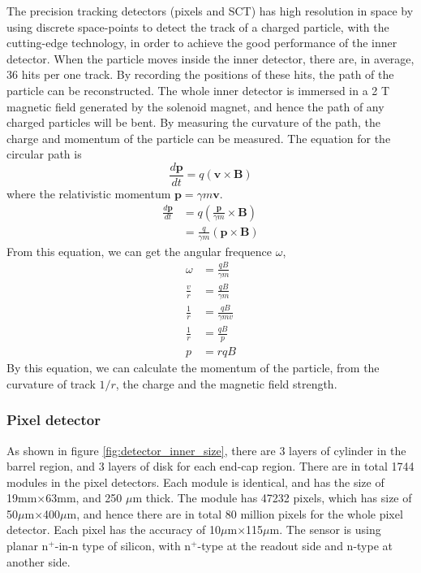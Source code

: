 The precision tracking detectors (pixels and SCT) has high resolution in space by using discrete space-points to detect the track of a charged particle, with the cutting-edge technology, in order to achieve the good performance of the inner detector.
When the particle moves inside the inner detector, there are, in average, 36 hits per one track.
By recording the positions of these hits, the path of the particle can be reconstructed.
The whole inner detector is immersed in a 2 T magnetic field generated by the solenoid magnet, and hence the path of any charged particles will be bent.
By measuring the curvature of the path, the charge and momentum of the particle can be measured.
The equation for the circular path is
\begin{equation}
\frac{d\mathbf{p}}{dt} = q(\mathbf{v} \times \mathbf{B})
\end{equation}
where the relativistic momentum $\mathbf{p} = \gamma m \mathbf{v}$.
\begin{align}
\frac{d\mathbf{p}}{dt} &= q( \frac{\mathbf{p}}{\gamma m} \times \mathbf{B}) \\
&= \frac{q}{\gamma m} (\mathbf{p} \times \mathbf{B})
\end{align}
From this equation, we can get the angular frequence $\omega$,
\begin{align}
\omega &= \frac{qB}{\gamma m} \\
\frac{v}{r} &= \frac{qB}{\gamma m} \\
\frac{1}{r} &= \frac{qB}{\gamma m v} \\
\frac{1}{r} &= \frac{qB}{p} \\
p &= rqB
\end{align}
By this equation, we can calculate the momentum of the particle, from the curvature of track $1/r$, the charge and the magnetic field strength.

\subsubsection{Pixel detector}
As shown in figure \ref{fig:detector_inner_size}, there are 3 layers of cylinder in the barrel region, and 3 layers of disk for each end-cap region.
There are in total 1744 modules in the pixel detectors.
Each module is identical, and has the size of 19mm$\times$63mm, and 250 $\mu$m thick.
The module has 47232 pixels, which has size of 50$\mu$m$\times$400$\mu$m, and hence there are in total 80 million pixels for the whole pixel detector.
Each pixel has the accuracy of 10$\mu$m$\times$115$\mu$m.
The sensor is using planar n$^{+}$-in-n type of silicon, with n$^{+}$-type at the readout side and n-type at another side.

